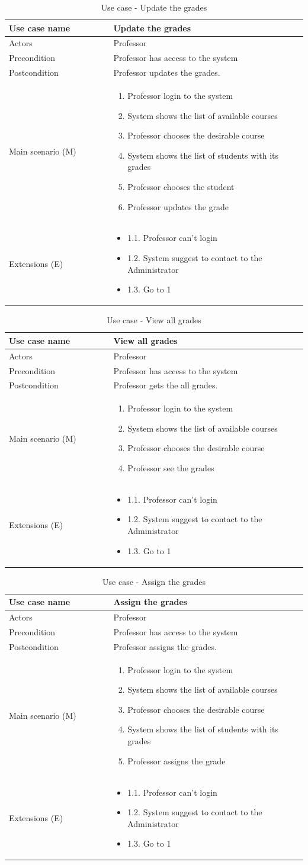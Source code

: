 \documentclass[12pt]{article}
\newcommand\tabularhead[1]{
\begin{table}[h]
  \caption{Use case - #1}
  \begin{tabular}{|p{0.35\linewidth}|p{0.65\linewidth}|}
    \hline
    \textbf{Use case name} & \textbf{#1} \\
    \hline}
\newcommand\addrow[2]{#1 &#2\\ \hline}
\newcommand\adddoublerow[2]{\begin{minipage}[t][][t]{2.5cm}#1\end{minipage}%
    &\begin{minipage}[t][][t]{\linewidth}
     \begin{itemize}\setlength{\itemsep}{0pt}%
        #2     
     \end{itemize}
     \end{minipage}\\ \hline}
\newcommand\addmulrow[2]{ \begin{minipage}[t][][t]{2.5cm}#1\end{minipage}%
     &\begin{minipage}[t][][t]{\linewidth}
      \begin{enumerate}\setlength{\itemsep}{0pt}%
        #2   
      \end{enumerate}
      \end{minipage}\\ \hline}
\newenvironment{usecase}{\tabularhead}
{\hline\end{tabular}\end{table}}
\begin{document}
\begin{usecase}{Update the grades}
    \addrow{Actors}{Professor}
    \addrow{Precondition}{Professor has access to the system}
    \addrow{Postcondition}{Professor updates the grades.}
    \addmulrow{Main scenario (M)}{
        \item Professor login to the system
        \item System shows the list of available courses
        \item Professor chooses the desirable course
        \item System shows the list of students with its grades
        \item Professor chooses the student
        \item Professor updates the grade
    }
    \adddoublerow{Extensions (E)}{
        \item[] 1.1. Professor can't login
        \item[] 1.2. System suggest to contact to the Administrator
        \item[] 1.3. Go to 1
    }
\end{usecase}
\newpage
\begin{usecase}{View all grades}
    \addrow{Actors}{Professor}
    \addrow{Precondition}{Professor has access to the system}
    \addrow{Postcondition}{Professor gets the all grades.}
    \addmulrow{Main scenario (M)}{
        \item Professor login to the system
        \item System shows the list of available courses
        \item Professor chooses the desirable course
        \item Professor see the grades
    }
    \adddoublerow{Extensions (E)}{
        \item[] 1.1. Professor can't login
        \item[] 1.2. System suggest to contact to the Administrator
        \item[] 1.3. Go to 1
    }
\end{usecase}

\begin{usecase}{Assign the grades}
    \addrow{Actors}{Professor}
    \addrow{Precondition}{Professor has access to the system}
    \addrow{Postcondition}{Professor assigns the grades.}
    \addmulrow{Main scenario (M)}{
        \item Professor login to the system
        \item System shows the list of available courses
        \item Professor chooses the desirable course
        \item System shows the list of students with its grades
        \item Professor assigns the grade
    }
    \adddoublerow{Extensions (E)}{
        \item[] 1.1. Professor can't login
        \item[] 1.2. System suggest to contact to the Administrator
        \item[] 1.3. Go to 1
    }
\end{usecase}
\end{document}
